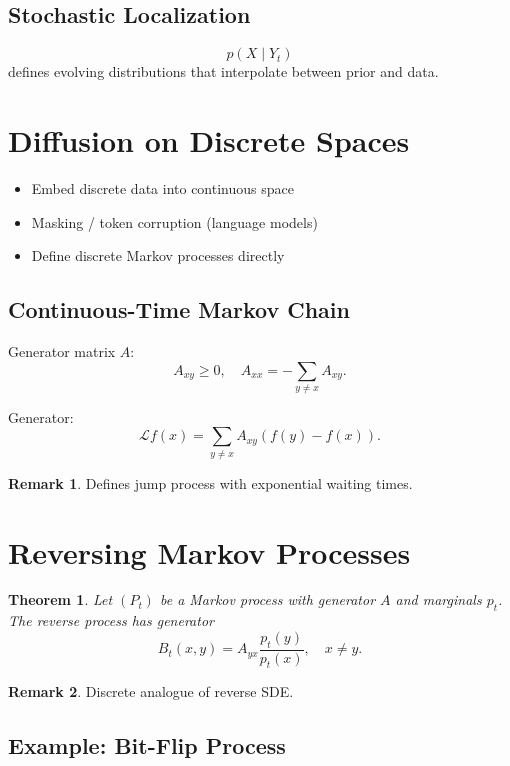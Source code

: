 \documentclass[12pt,oneside]{book}
\numberwithin{equation}{section}
\theoremstyle{definition}
\newtheorem{remark}{Remark}[section]
\theoremstyle{plain}
\newtheorem{theorem}{Theorem}[section]
\theoremstyle{remark}
\begin{document}
\subsection{Stochastic Localization}

\[
p(X \mid Y_t)
\]
defines evolving distributions that interpolate between prior and data.

\section{Diffusion on Discrete Spaces}

\begin{itemize}
    \item Embed discrete data into continuous space
    \item Masking / token corruption (language models)
    \item Define discrete Markov processes directly
\end{itemize}

\subsection{Continuous-Time Markov Chain}

Generator matrix $A$:
\[
A_{xy} \ge 0,\quad A_{xx} = -\sum_{y\ne x} A_{xy}.
\]

Generator:
\[
\mathcal{L}f(x) = \sum_{y \ne x} A_{xy}(f(y) - f(x)).
\]

\begin{remark}
Defines jump process with exponential waiting times.
\end{remark}

\section{Reversing Markov Processes}

\begin{theorem}
Let $(P_t)$ be a Markov process with generator $A$ and marginals $p_t$.  
The reverse process has generator
\[
B_t(x,y) = A_{yx} \frac{p_t(y)}{p_t(x)}, \quad x \ne y.
\]
\end{theorem}

\begin{remark}
Discrete analogue of reverse SDE.
\end{remark}

\subsection{Example: Bit-Flip Process}
\end{document}
